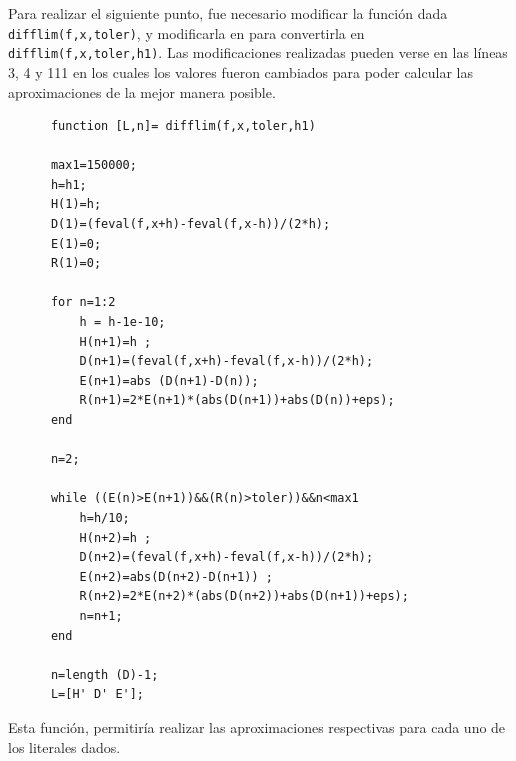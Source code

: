 \documentclass[english,notitlepage,letterpaper, 10pt]{article} %
\begin{document}
    Para realizar el siguiente punto, fue necesario modificar la función dada \texttt{difflim(f,x,toler)}, y modificarla en para convertirla en \texttt{difflim(f,x,toler,h1)}. Las modificaciones realizadas pueden verse en las líneas 3, 4 y 111 en los cuales los valores fueron cambiados para poder calcular las aproximaciones de la mejor manera posible.

    \begin{lstlisting}
      function [L,n]= difflim(f,x,toler,h1)

      max1=150000;
      h=h1;
      H(1)=h;
      D(1)=(feval(f,x+h)-feval(f,x-h))/(2*h);
      E(1)=0;
      R(1)=0;

      for n=1:2
          h = h-1e-10;
          H(n+1)=h ;
          D(n+1)=(feval(f,x+h)-feval(f,x-h))/(2*h);
          E(n+1)=abs (D(n+1)-D(n));
          R(n+1)=2*E(n+1)*(abs(D(n+1))+abs(D(n))+eps);
      end

      n=2;

      while ((E(n)>E(n+1))&&(R(n)>toler))&&n<max1
          h=h/10;
          H(n+2)=h ;
          D(n+2)=(feval(f,x+h)-feval(f,x-h))/(2*h);
          E(n+2)=abs(D(n+2)-D(n+1)) ;
          R(n+2)=2*E(n+2)*(abs(D(n+2))+abs(D(n+1))+eps);
          n=n+1;
      end

      n=length (D)-1;
      L=[H' D' E'];
    \end{lstlisting}

    Esta función, permitiría realizar las aproximaciones respectivas para cada uno de los literales dados.
\end{document}

